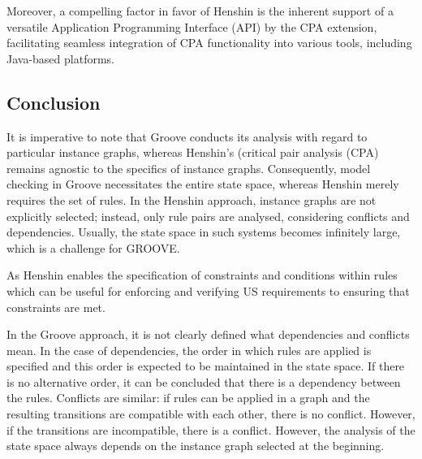 Moreover, a compelling factor in favor of Henshin is the inherent support of a versatile Application Programming Interface (API) by the CPA extension, facilitating seamless integration of CPA functionality into various tools, including Java-based platforms.

\subsection{Conclusion}\label{henshin_groove_conclusion}
It is imperative to note that Groove conducts its analysis with regard to particular instance graphs, whereas Henshin's (critical pair analysis (CPA) remains agnostic to the specifics of instance graphs. Consequently, model checking in Groove necessitates the entire state space, whereas Henshin merely requires the set of rules. In the Henshin approach, instance graphs are not explicitly selected; instead, only rule pairs are analysed, considering conflicts and dependencies. Usually, the state space in such systems becomes infinitely large, which is a challenge for GROOVE.

As Henshin enables the specification of constraints and conditions within rules which can be useful for enforcing and verifying US requirements to ensuring that constraints are met.

In the Groove approach, it is not clearly defined what dependencies and conflicts mean. In the case of dependencies, the order in which rules are applied is specified and this order is expected to be maintained in the state space. If there is no alternative order, it can be concluded that there is a dependency between the rules. Conflicts are similar: if rules can be applied in a graph and the resulting transitions are compatible with each other, there is no conflict. However, if the transitions are incompatible, there is a conflict. However, the analysis of the state space always depends on the instance graph selected at the beginning.
